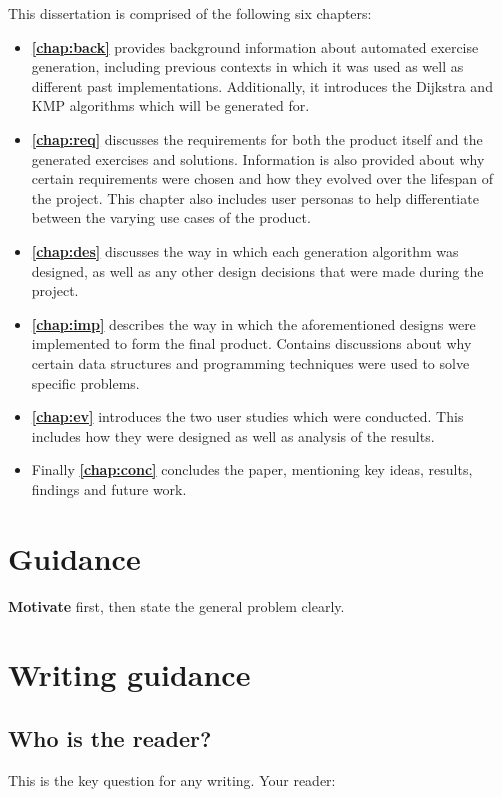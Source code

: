 \documentclass{l4proj}
\begin{document}
This dissertation is comprised of the following six chapters:
\begin{itemize}
	\item
	\textbf{\autoref{chap:back}} provides background information about automated exercise generation, including previous contexts in which it was used as well as different past implementations. Additionally, it introduces the Dijkstra and KMP algorithms which will be generated for.
	\item
	\textbf{\autoref{chap:req}} discusses the requirements for both the product itself and the generated exercises and solutions. Information is also provided about why certain requirements were chosen and how they evolved over the lifespan of the project. This chapter also includes user personas to help differentiate between the varying use cases of the product.
	\item
	\textbf{\autoref{chap:des}} discusses the way in which each generation algorithm was designed, as well as any other design decisions that were made during the project.
	\item
	\textbf{\autoref{chap:imp}} describes the way in which the aforementioned designs were implemented to form the final product. Contains discussions about why certain data structures and programming techniques were used to solve specific problems.
	\item
	\textbf{\autoref{chap:ev}} introduces the two user studies which were conducted. This includes how they were designed as well as analysis of the results.
	\item
	Finally \textbf{\autoref{chap:conc}} concludes the paper, mentioning key ideas, results, findings and future work.
\end{itemize}

\section{Guidance}

\textbf{Motivate} first, then state the general problem clearly. 

\section{Writing guidance}
\subsection{Who is the reader?}

This is the key question for any writing. Your reader:
\end{document}
